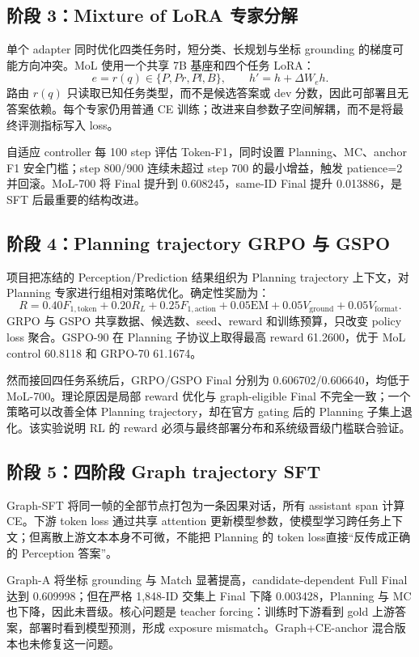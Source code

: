 \documentclass[UTF8,a4paper,11pt]{ctexart}
\begin{document}
\subsection{阶段 3：Mixture of LoRA 专家分解}
单个 adapter 同时优化四类任务时，短分类、长规划与坐标 grounding 的梯度可能方向冲突。MoL 使用一个共享 7B 基座和四个任务 LoRA：
\[
e=r(q)\in\{P,Pr,Pl,B\},\qquad
h'=h+\Delta W_e h.
\]
路由 \(r(q)\) 只读取已知任务类型，而不是候选答案或 dev 分数，因此可部署且无答案依赖。每个专家仍用普通 CE 训练；改进来自参数子空间解耦，而不是将最终评测指标写入 loss。

自适应 controller 每 100 step 评估 Token-F1，同时设置 Planning、MC、anchor F1 安全门槛；step 800/900 连续未超过 step 700 的最小增益，触发 patience=2 并回滚。MoL-700 将 Final 提升到 0.608245，same-ID Final 提升 0.013886，是 SFT 后最重要的结构改进。

\subsection{阶段 4：Planning trajectory GRPO 与 GSPO}
项目把冻结的 Perception/Prediction 结果组织为 Planning trajectory 上下文，对 Planning 专家进行组相对策略优化。确定性奖励为：
\[
R=0.40F_{1,\mathrm{token}}+0.20R_{L}
+0.25F_{1,\mathrm{action}}+0.05\mathrm{EM}
+0.05V_{\mathrm{ground}}+0.05V_{\mathrm{format}}.
\]
GRPO 与 GSPO 共享数据、候选数、seed、reward 和训练预算，只改变 policy loss 聚合。GSPO-90 在 Planning 子协议上取得最高 reward 61.2600，优于 MoL control 60.8118 和 GRPO-70 61.1674。

然而接回四任务系统后，GRPO/GSPO Final 分别为 0.606702/0.606640，均低于 MoL-700。理论原因是局部 reward 优化与 graph-eligible Final 不完全一致；一个策略可以改善全体 Planning trajectory，却在官方 gating 后的 Planning 子集上退化。该实验说明 RL 的 reward 必须与最终部署分布和系统级晋级门槛联合验证。

\subsection{阶段 5：四阶段 Graph trajectory SFT}
Graph-SFT 将同一帧的全部节点打包为一条因果对话，所有 assistant span 计算 CE。下游 token loss 通过共享 attention 更新模型参数，使模型学习跨任务上下文；但离散上游文本本身不可微，不能把 Planning 的 token loss直接“反传成正确的 Perception 答案”。

Graph-A 将坐标 grounding 与 Match 显著提高，candidate-dependent Full Final 达到 0.609998；但在严格 1,848-ID 交集上 Final 下降 0.003428，Planning 与 MC 也下降，因此未晋级。核心问题是 teacher forcing：训练时下游看到 gold 上游答案，部署时看到模型预测，形成 exposure mismatch。Graph+CE-anchor 混合版本也未修复这一问题。
\end{document}
